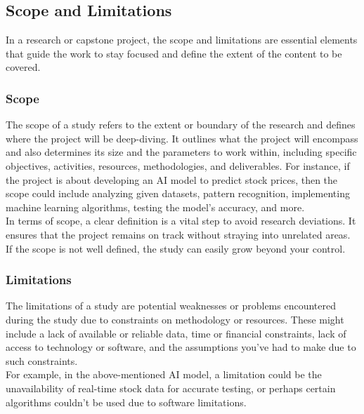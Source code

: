     \subsection{Scope and Limitations}
        In a research or capstone project, the scope and limitations are essential elements that guide the work to stay focused and define the extent of the content to be covered. 
        \subsubsection{Scope}
            The scope of a study refers to the extent or boundary of the research and defines where the project will be deep-diving. It outlines what the project will encompass and also determines its size and the parameters to work within, including specific objectives, activities, resources, methodologies, and deliverables. For instance, if the project is about developing an AI model to predict stock prices, then the scope could include analyzing given datasets, pattern recognition, implementing machine learning algorithms, testing the model's accuracy, and more.\\
            In terms of scope, a clear definition is a vital step to avoid research deviations. It ensures that the project remains on track without straying into unrelated areas. If the scope is not well defined, the study can easily grow beyond your control.
        \subsubsection{Limitations}
            The limitations of a study are potential weaknesses or problems encountered during the study due to constraints on methodology or resources. These might include a lack of available or reliable data, time or financial constraints, lack of access to technology or software, and the assumptions you've had to make due to such constraints. \\
            For example, in the above-mentioned AI model, a limitation could be the unavailability of real-time stock data for accurate testing, or perhaps certain algorithms couldn't be used due to software limitations.